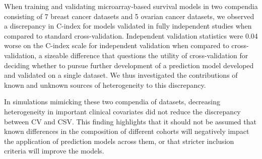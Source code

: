 \documentclass{bioinfo}
\begin{document}
When training and validating microarray-based survival models in two 
compendia consisting of 7 breast cancer datasets and 5 ovarian cancer datasets,  
we observed a discrepancy in C-index for models validated in fully
independent studies when compared to standard cross-validation.
Independent validation statistics were 0.04 worse on the
C-index scale for independent validation when compared to
cross-validation, a sizeable difference that questions the utility 
of cross-validation for deciding whether to
pursue further development of a prediction model developed and
validated on a single dataset. We thus investigated the contributions of
known and unknown sources of heterogeneity to this discrepancy.

In simulations mimicking these two compendia of datasets, decreasing
heterogeneity in important clinical covariates %
did not reduce the
discrepancy between CV and CSV. %
This finding highlights that it should not be assumed that known
differences in the composition of different cohorts will negatively
impact the application of prediction models across them, or that
stricter inclusion criteria will improve the models.

\end{document}
